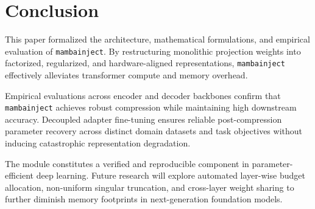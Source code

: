 \section{Conclusion}
This paper formalized the architecture, mathematical formulations, and empirical evaluation of \texttt{mambainject}. By restructuring monolithic projection weights into factorized, regularized, and hardware-aligned representations, \texttt{mambainject} effectively alleviates transformer compute and memory overhead.

Empirical evaluations across encoder and decoder backbones confirm that \texttt{mambainject} achieves robust compression while maintaining high downstream accuracy. Decoupled adapter fine-tuning ensures reliable post-compression parameter recovery across distinct domain datasets and task objectives without inducing catastrophic representation degradation.

The module constitutes a verified and reproducible component in parameter-efficient deep learning. Future research will explore automated layer-wise budget allocation, non-uniform singular truncation, and cross-layer weight sharing to further diminish memory footprints in next-generation foundation models.
